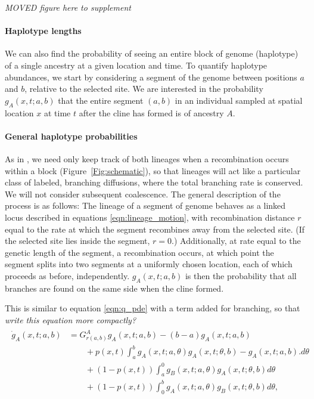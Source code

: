 \documentclass[11pt,letterpaper]{article}
\newcommand{\alisa}[1]{{\em \color{red} #1}}
\newcommand{\plr}[1]{{\em \color{blue} #1}}
\begin{document}
\alisa{MOVED figure here to supplement}

\paragraph{Haplotype lengths}
We can also find the probability of seeing an entire block of genome (haplotype)
of a single ancestry at a given location and time.
To quantify haplotype abundances, we start by considering a segment of the genome between positions $a$ and $b$, relative to the selected site. We are interested in the probability  $g_A(x,t;a,b)$ that the entire segment $(a,b)$ in an individual sampled at spatial location $x$ at time $t$ after the cline has formed is of ancestry $A$.


\paragraph{General haplotype probabilities}
As in \citet{Sedghifar2015}, we need only keep track of both lineages when a recombination occurs within a block (Figure~\ref{Fig:schematic}),
so that lineages will act like a particular class of labeled, branching diffusions,
where the total branching rate is conserved. We will not consider subsequent coalescence.
The general description of the process is as follows:
The lineage of a segment of genome behaves as a linked locus described in equations \eqref{eqn:lineage_motion},
with recombination distance $r$ equal to the rate at which the segment recombines away from the selected site.
(If the selected site lies inside the segment, $r=0$.)
Additionally, at rate equal to the genetic length of the segment,
a recombination occurs, at which point the segment splits into two segments at a uniformly chosen location,
each of which proceeds as before, independently. $g_A(x,t;a,b)$ is then the  probability that all branches are found on the same side when the cline formed. 

This is similar to equation \eqref{eqn:q_pde} with a term added for branching, so that 
\plr{write this equation more compactly?}
\begin{align}
    \begin{aligned} \label{eqn:g_pde}
        \dot g_A(x,t;a,b) 
            &= G_{r(a,b)}^A g_A(x,t;a,b) 
            - (b-a) g_A(x,t;a,b) 
            \\ {} & \qquad 
            + p(x,t) \int_a^b {
                g_A(x,t;a,\theta) g_A(x,t;\theta,b) 
                - g_A(x,t;a,b) .
            } d\theta
            \\ {} & \qquad 
            + (1-p(x,t)) \int_a^0 {
                g_B(x,t;a,\theta) g_A(x,t;\theta,b)
            } d\theta
            \\ {} & \qquad 
            + (1-p(x,t)) \int_0^b {
                g_A(x,t;a,\theta) g_B(x,t;\theta,b)
            } d\theta,
    \end{aligned}
\end{align}
\end{document}
